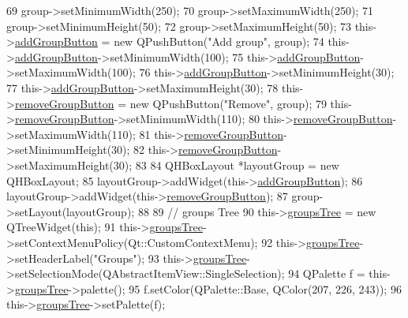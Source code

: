 \begin{DoxyCode}
69     group->setMinimumWidth(250);
70     group->setMaximumWidth(250);
71     group->setMinimumHeight(50);
72     group->setMaximumHeight(50);
73     this->\hyperlink{classTreeArea_a6e20bfd0bba99c036d7909d246a3fffa}{addGroupButton} = \textcolor{keyword}{new} QPushButton(\textcolor{stringliteral}{"Add group"}, group);
74     this->\hyperlink{classTreeArea_a6e20bfd0bba99c036d7909d246a3fffa}{addGroupButton}->setMinimumWidth(100);
75     this->\hyperlink{classTreeArea_a6e20bfd0bba99c036d7909d246a3fffa}{addGroupButton}->setMaximumWidth(100);
76     this->\hyperlink{classTreeArea_a6e20bfd0bba99c036d7909d246a3fffa}{addGroupButton}->setMinimumHeight(30);
77     this->\hyperlink{classTreeArea_a6e20bfd0bba99c036d7909d246a3fffa}{addGroupButton}->setMaximumHeight(30);
78     this->\hyperlink{classTreeArea_ab1bb8dfaad1425a3b1fcd48f75f140f2}{removeGroupButton} = \textcolor{keyword}{new} QPushButton(\textcolor{stringliteral}{"Remove"}, group);
79     this->\hyperlink{classTreeArea_ab1bb8dfaad1425a3b1fcd48f75f140f2}{removeGroupButton}->setMinimumWidth(110);
80     this->\hyperlink{classTreeArea_ab1bb8dfaad1425a3b1fcd48f75f140f2}{removeGroupButton}->setMaximumWidth(110);
81     this->\hyperlink{classTreeArea_ab1bb8dfaad1425a3b1fcd48f75f140f2}{removeGroupButton}->setMinimumHeight(30);
82     this->\hyperlink{classTreeArea_ab1bb8dfaad1425a3b1fcd48f75f140f2}{removeGroupButton}->setMaximumHeight(30);
83 
84     QHBoxLayout *layoutGroup = \textcolor{keyword}{new} QHBoxLayout;
85     layoutGroup->addWidget(this->\hyperlink{classTreeArea_a6e20bfd0bba99c036d7909d246a3fffa}{addGroupButton});
86     layoutGroup->addWidget(this->\hyperlink{classTreeArea_ab1bb8dfaad1425a3b1fcd48f75f140f2}{removeGroupButton});
87     group->setLayout(layoutGroup);
88 
89     \textcolor{comment}{// groups Tree}
90     this->\hyperlink{classTreeArea_ab3cf8ca35655b0bace24a7c46170852f}{groupsTree} = \textcolor{keyword}{new} QTreeWidget(\textcolor{keyword}{this});
91     this->\hyperlink{classTreeArea_ab3cf8ca35655b0bace24a7c46170852f}{groupsTree}->setContextMenuPolicy(Qt::CustomContextMenu);
92     this->\hyperlink{classTreeArea_ab3cf8ca35655b0bace24a7c46170852f}{groupsTree}->setHeaderLabel(\textcolor{stringliteral}{"Groups"});
93     this->\hyperlink{classTreeArea_ab3cf8ca35655b0bace24a7c46170852f}{groupsTree}->setSelectionMode(QAbstractItemView::SingleSelection);
94     QPalette f = this->\hyperlink{classTreeArea_ab3cf8ca35655b0bace24a7c46170852f}{groupsTree}->palette();
95     f.setColor(QPalette::Base, QColor(207, 226, 243));
96     this->\hyperlink{classTreeArea_ab3cf8ca35655b0bace24a7c46170852f}{groupsTree}->setPalette(f);

\end{DoxyCode}
